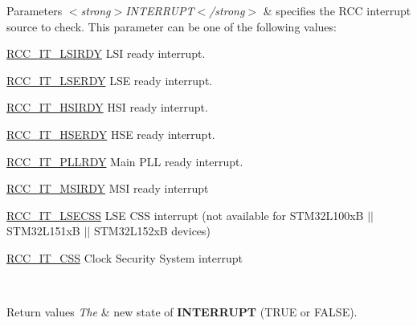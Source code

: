 \begin{DoxyParams}{Parameters}
{\em $<$strong$>$\-I\-N\-T\-E\-R\-R\-U\-P\-T$<$/strong$>$} & specifies the R\-C\-C interrupt source to check. This parameter can be one of the following values\-: \begin{DoxyItemize}
\item \hyperlink{group___r_c_c___interrupt_ga2b4ef277c1b71f96e0bef4b9a72fca94}{R\-C\-C\-\_\-\-I\-T\-\_\-\-L\-S\-I\-R\-D\-Y} L\-S\-I ready interrupt. \item \hyperlink{group___r_c_c___interrupt_gad6b6e78a426850f595ef180d292a673d}{R\-C\-C\-\_\-\-I\-T\-\_\-\-L\-S\-E\-R\-D\-Y} L\-S\-E ready interrupt. \item \hyperlink{group___r_c_c___interrupt_ga69637e51b71f73f519c8c0a0613d042f}{R\-C\-C\-\_\-\-I\-T\-\_\-\-H\-S\-I\-R\-D\-Y} H\-S\-I ready interrupt. \item \hyperlink{group___r_c_c___interrupt_gad13eaede352bca59611e6cae68665866}{R\-C\-C\-\_\-\-I\-T\-\_\-\-H\-S\-E\-R\-D\-Y} H\-S\-E ready interrupt. \item \hyperlink{group___r_c_c___interrupt_ga68d48e7811fb58f2649dce6cf0d823d9}{R\-C\-C\-\_\-\-I\-T\-\_\-\-P\-L\-L\-R\-D\-Y} Main P\-L\-L ready interrupt. \item \hyperlink{group___r_c_c___interrupt_gae0cfda620ac8949e5b266661dba7ba0a}{R\-C\-C\-\_\-\-I\-T\-\_\-\-M\-S\-I\-R\-D\-Y} M\-S\-I ready interrupt \item \hyperlink{group___r_c_c___interrupt_gaf3f259914cb56820b1649c9d4413736c}{R\-C\-C\-\_\-\-I\-T\-\_\-\-L\-S\-E\-C\-S\-S} L\-S\-E C\-S\-S interrupt (not available for S\-T\-M32\-L100x\-B $\vert$$\vert$ S\-T\-M32\-L151x\-B $\vert$$\vert$ S\-T\-M32\-L152x\-B devices) \item \hyperlink{group___r_c_c___interrupt_ga9bb34a4912d2084dc1c0834eb53aa7a3}{R\-C\-C\-\_\-\-I\-T\-\_\-\-C\-S\-S} Clock Security System interrupt \end{DoxyItemize}
\\
\hline
\end{DoxyParams}

\begin{DoxyRetVals}{Return values}
{\em The} & new state of {\bfseries I\-N\-T\-E\-R\-R\-U\-P\-T} (T\-R\-U\-E or F\-A\-L\-S\-E). \\
\hline
\end{DoxyRetVals}
